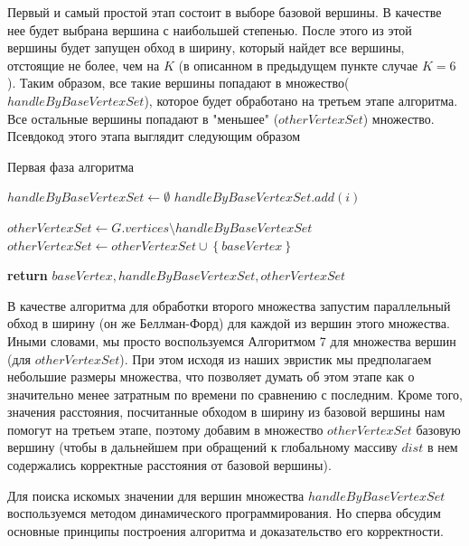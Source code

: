 Первый и самый простой этап состоит в выборе базовой вершины. В качестве нее будет выбрана вершина с наибольшей степенью. После этого из этой вершины будет запущен обход в ширину, который найдет все вершины, отстоящие не более, чем на $K$ (в описанном в предыдущем пункте случае $K = 6$). Таким образом, все такие вершины попадают в множество($handleByBaseVertexSet$), которое будет обработано на третьем этапе алгоритма. Все остальные вершины попадают в "меньшее" ($otherVertexSet$) множество. Псевдокод этого этапа выглядит следующим образом

\FloatBarrier
\begin{algorithm}
\caption{Первая фаза алгоритма}\label{all_pairs_social1}
\begin{algorithmic}[1]
\State $handleByBaseVertexSet \gets \emptyset$
\algrenewcommand{} 
\algrenewcommand{}
		\State $handleByBaseVertexSet.add(i)$
	\EndIf
\EndFor

\State $otherVertexSet \gets G.vertices \setminus handleByBaseVertexSet$
\State $otherVertexSet \gets otherVertexSet \cup  \left\{ {baseVertex}\right\}$
 
\State \textbf{return} $ baseVertex, handleByBaseVertexSet, otherVertexSet$
\EndProcedure

\end{algorithmic}
\end{algorithm}




В качестве алгоритма для обработки второго множества запустим параллельный обход в ширину (он же Беллман-Форд) для каждой из вершин этого множества. Иными словами, мы просто воспользуемся Алгоритмом 7 для множества вершин (для $otherVertexSet$). При этом исходя из наших эвристик мы предполагаем небольшие размеры множества, что позволяет думать об этом этапе как о значительно менее затратным по времени по сравнению с последним. Кроме того, значения расстояния, посчитанные обходом в ширину из базовой вершины нам помогут на третьем этапе, поэтому добавим в множество $otherVertexSet$ базовую вершину (чтобы в дальнейшем при обращений к глобальному массиву $dist$ в нем содержались корректные расстояния от базовой вершины).

Для поиска искомых значении для вершин множества $handleByBaseVertexSet$ воспользуемся методом динамического программирования. Но сперва обсудим основные принципы построения алгоритма и доказательство его корректности. 

